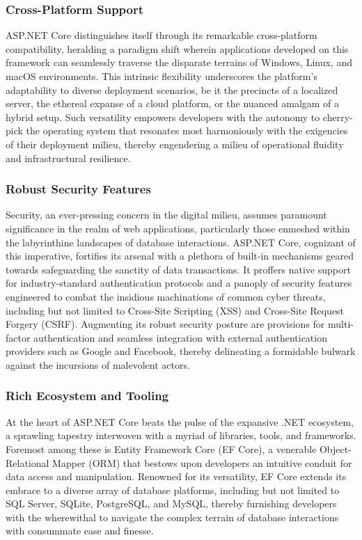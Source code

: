\subsubsection*{Cross-Platform Support}
ASP.NET Core distinguishes itself through its remarkable cross-platform
compatibility, heralding a paradigm shift wherein applications developed on this
framework can seamlessly traverse the disparate terrains of Windows, Linux, and
macOS environments. This intrinsic flexibility underscores the platform's
adaptability to diverse deployment scenarios, be it the precincts of a localized
server, the ethereal expanse of a cloud platform, or the nuanced amalgam of a
hybrid setup. Such versatility empowers developers with the autonomy to
cherry-pick the operating system that resonates most harmoniously with the
exigencies of their deployment milieu, thereby engendering a milieu of
operational fluidity and infrastructural resilience.

\subsubsection*{Robust Security Features}
Security, an ever-pressing concern in the digital milieu, assumes paramount
significance in the realm of web applications, particularly those enmeshed
within the labyrinthine landscapes of database interactions. ASP.NET Core,
cognizant of this imperative, fortifies its arsenal with a plethora of built-in
mechanisms geared towards safeguarding the sanctity of data transactions. It
proffers native support for industry-standard authentication protocols and a
panoply of security features engineered to combat the insidious machinations of
common cyber threats, including but not limited to Cross-Site Scripting (XSS)
and Cross-Site Request Forgery (CSRF). Augmenting its robust security posture
are provisions for multi-factor authentication and seamless integration with
external authentication providers such as Google and Facebook, thereby
delineating a formidable bulwark against the incursions of malevolent actors.

\subsubsection*{Rich Ecosystem and Tooling}
At the heart of ASP.NET Core beats the pulse of the expansive .NET ecosystem, a
sprawling tapestry interwoven with a myriad of libraries, tools, and frameworks.
Foremost among these is Entity Framework Core (EF Core), a venerable
Object-Relational Mapper (ORM) that bestows upon developers an intuitive conduit
for data access and manipulation. Renowned for its versatility, EF Core extends
its embrace to a diverse array of database platforms, including but not limited
to SQL Server, SQLite, PostgreSQL, and MySQL, thereby furnishing developers with
the wherewithal to navigate the complex terrain of database interactions with
consummate ease and finesse.

